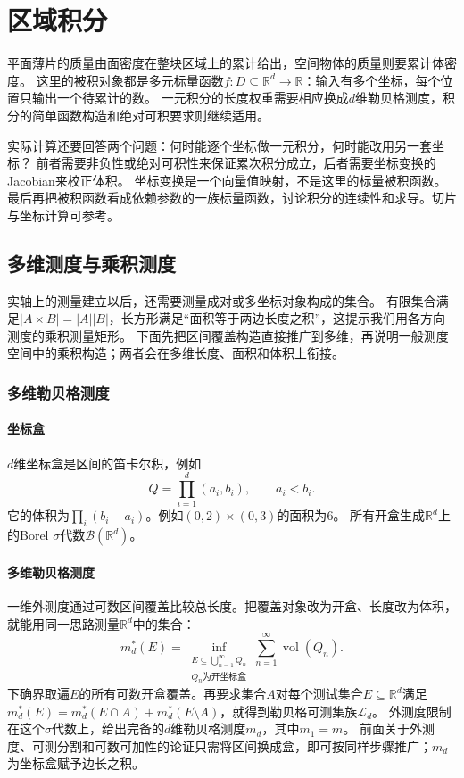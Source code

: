 \section{区域积分}
\label{sec:multivariable-region-integration}

平面薄片的质量由面密度在整块区域上的累计给出，空间物体的质量则要累计体密度。
这里的被积对象都是多元标量函数$f:D\subseteq\mathbb R^d\to\mathbb R$：输入有多个坐标，每个位置只输出一个待累计的数。
一元积分的长度权重需要相应换成$d$维勒贝格测度，积分的简单函数构造和绝对可积要求则继续适用。

实际计算还要回答两个问题：何时能逐个坐标做一元积分，何时能改用另一套坐标？
前者需要非负性或绝对可积性来保证累次积分成立，后者需要坐标变换的Jacobian来校正体积。
坐标变换是一个向量值映射，不是这里的标量被积函数。
最后再把被积函数看成依赖参数的一族标量函数，讨论积分的连续性和求导。切片与坐标计算可参考。

\subsection{多维测度与乘积测度}
\label{sec:comb-multidimensional-product-measure}

实轴上的测量建立以后，还需要测量成对或多坐标对象构成的集合。
有限集合满足$|A\times B|=|A||B|$，长方形满足“面积等于两边长度之积”，这提示我们用各方向测度的乘积测量矩形。
下面先把区间覆盖构造直接推广到多维，再说明一般测度空间中的乘积构造；两者会在多维长度、面积和体积上衔接。

\subsubsection{多维勒贝格测度}

\paragraph{坐标盒}

$d$维坐标盒是区间的笛卡尔积，例如
\[
 Q=\prod_{i=1}^d(a_i,b_i),\qquad a_i<b_i.
\]
它的体积为$\prod_i(b_i-a_i)$。例如$(0,2)\times(0,3)$的面积为$6$。
所有开盒生成$\mathbb R^d$上的Borel $\sigma$代数$\mathcal B(\mathbb R^d)$。

\paragraph{多维勒贝格测度}

一维外测度通过可数区间覆盖比较总长度。把覆盖对象改为开盒、长度改为体积，就能用同一思路测量$\mathbb R^d$中的集合：
\[
 m_d^*(E)=\inf_{\substack{E\subseteq\bigcup_{n=1}^{\infty}Q_n\\
 Q_n\text{为开坐标盒}}}\sum_{n=1}^{\infty}\operatorname{vol}(Q_n).
\]
下确界取遍$E$的所有可数开盒覆盖。再要求集合$A$对每个测试集合$E\subseteq\mathbb R^d$满足
$m_d^*(E)=m_d^*(E\cap A)+m_d^*(E\setminus A)$，就得到勒贝格可测集族$\mathcal L_d$。
外测度限制在这个$\sigma$代数上，给出完备的$d$维勒贝格测度$m_d$，其中$m_1=m$。
前面关于外测度、可测分割和可数可加性的论证只需将区间换成盒，即可按同样步骤推广；$m_d$为坐标盒赋予边长之积。

